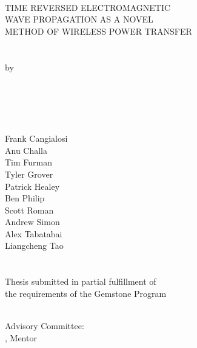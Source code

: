 \hbox{\ }
\vspace{0.5in}
\startSINGLEspacing
\begin{center}

\large{{TIME REVERSED ELECTROMAGNETIC\\
        WAVE PROPAGATION AS A NOVEL \\
        METHOD OF WIRELESS POWER TRANSFER}}\\
\ \\
\ \\
\large{by} \\
\ \\
\large{\teamname}
\ \\
\ \\
\ \\
\ \\
\small\normalsize
Frank Cangialosi\\
Anu Challa\\
Tim Furman\\
Tyler Grover\\
Patrick Healey\\
Ben Philip\\
Scott Roman\\
Andrew Simon\\
Alex Tabatabai\\
Liangcheng Tao\\
\ \\ 
\ \\
Thesis submitted in partial fulfillment of \\ 
the requirements of the Gemstone Program\\
\Umd \\
\the\year
\end{center}

\vspace{7.5em}

\noindent Advisory Committee: \\
\mentor, Mentor
\discussantsEACHLINE
